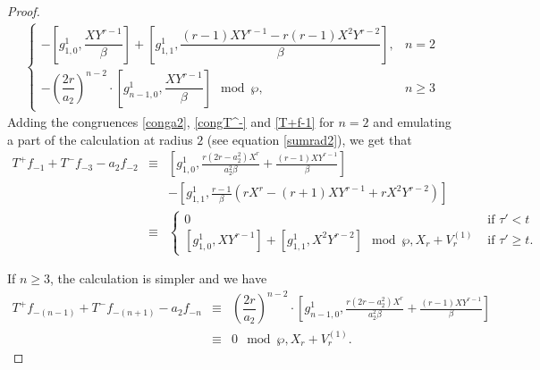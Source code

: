 \documentclass[11pt, reqno]{amsart}
\numberwithin{equation}{section}
\theoremstyle{definition}
\theoremstyle{remark}
\theoremstyle{definition}
\theoremstyle{remark}
\theoremstyle{remark}
\begin{document}
\begin{proof}
\begin{eqnarray}
\begin{cases}
        -\left[g_{1,0}^1, \dfrac{XY^{r-1}}{\beta}\right] 
+ \left[g_{1,1}^1, \dfrac{(r-1)XY^{r-1}-r(r-1)X^2Y^{r-2}}{\beta}\right] , & n=2 \\
-\left(\dfrac{2r}{a_2}\right)^{n-2}\cdot\left[g_{n-1,0}^1, \dfrac{XY^{r-1}}{\beta}\right]\mod\wp, &n\geq 3
\end{cases}
\end{eqnarray}
Adding the congruences
\eqref{conga2}, \eqref{congT^-} and \eqref{T+f-1} for $n=2$ and emulating a part of the calculation at radius $2$ (see equation \eqref{sumrad2}), we get that
\begin{eqnarray*}
T^+f_{-1}+T^-f_{-3}-a_{2}f_{-2} &\equiv &\left[g_{1,0}^{1}, \frac{r(2r-a_{2}^2)X^{r}}{a_{2}^2\beta} +\frac{(r-1)XY^{r-1}}{\beta} \right] \\
&& -\left[g_{1,1}^{1}, \frac{r-1}{\beta}\left(rX^r -(r+1)XY^{r-1}+rX^{2}Y^{r-2}\right) \right]\\
    &\equiv& \begin{cases}
0 & \text{ if } \tau'<t\\
     \left[g_{1,0}^{1}, XY^{r-1}\right] + \left[g_{1,1}^{1},  X^2Y^{r-2} \right]\mod \wp,X_{r}+V_{r}^{(1)} & \text{ if } \tau'\geq t.
    \end{cases}
    \end{eqnarray*}


If $n\geq3$, the calculation is simpler and we have
\begin{eqnarray*}
T^+f_{-(n-1)}+T^-f_{-(n+1)}-a_{2}f_{-n} &\equiv& \left(\dfrac{2r}{a_2}\right)^{n-2}\cdot\left[g_{n-1,0}^1, \frac{r(2r-a_{2}^2)X^{r}}{a_{2}^2\beta}+\frac{(r-1)XY^{r-1}}{\beta}\right] \\
&\equiv& 0 \mod \wp,X_{r}+V_{r}^{(1)}.
\end{eqnarray*}












\end{proof}
\end{document}

